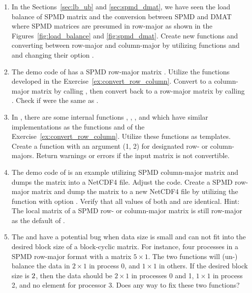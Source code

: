 \begin{enumerate}[label=\thechapter-\arabic*]
\item
\label{ex:convert_row_column}
In the Sections~\ref{sec:lb_ub} and \ref{sec:spmd_dmat},
we have seen the load balance of SPMD matrix
and the conversion between SPMD and DMAT where SPMD matrices 
are presumed in row-major as shown in
the Figures~\ref{fig:load_balance} and \ref{fig:spmd_dmat}.
Create new functions
 and  converting between
row-major and column-major by utilizing functions 
and  and changing their option .

\item
The demo code  of  has a SPMD row-major
matrix .
Utilize the functions developed in the
Exercise~\ref{ex:convert_row_column}.
Convert  to a column-major matrix 
by calling , then convert  back to a
row-major matrix  by calling .
Check if  were the same as .

\item
In , there are some internal functions ,
, , and
 which have similar implementations as the
functions  and  of the
Exercise~\ref{ex:convert_row_column}. Utilize these functions as templates.
Create a function  with an argument  (1, 2)
for designated row- or column-majors.
Return warnings or errors if the input matrix is not convertible.

\item
\label{ex:nc4_spmdr}
The demo code  of  is an example utilizing
SPMD column-major matrix  
and dumps the matrix into a NetCDF4
file. Adjust the code. Create a SPMD row-major matrix  and dump
the matrix to a new NetCDF4 file  by utilizing the function
 with option . Verify that all
 values of both  and 
are identical.
{\color{blue}Hint:
The local matrix of a SPMD row- or column-major matrix is still
row-major as the default of .
}

\item
The  and  have a potential bug
when data size is small and can not fit into the desired block size of
a block-cyclic matrix. For instance, four processes in
a SPMD row-major format with a matrix $5\times 1$. The two functions will
(un-) balance the data in $2\times 1$ in process 0, and $1\times 1$ in others.
If the desired block size is $2\time 1$, then the data should be
$2\times 1$ in processes 0 and 1, $1\times 1$ in process 2, and no
element for processor 3. Does any way to fix these two functions?

\end{enumerate}

